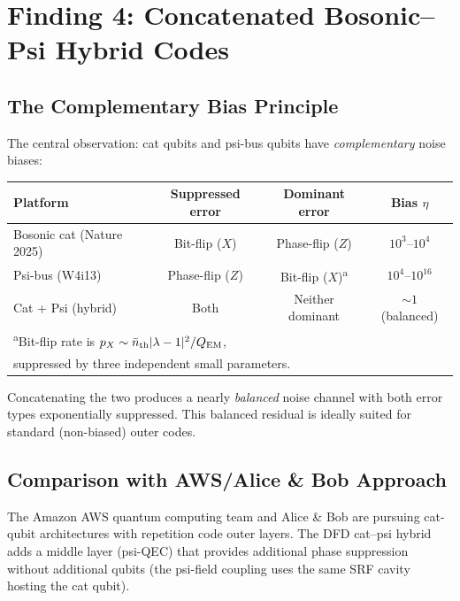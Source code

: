 \documentclass[11pt]{article}
\theoremstyle{definition}
\theoremstyle{remark}
\newcommand{\lamdiff}{|\lambda-1|}
\begin{document}
\section{Finding 4: Concatenated Bosonic--Psi Hybrid Codes}
\label{sec:bosonic-psi}

\subsection{The Complementary Bias Principle}
\label{sec:complementary-bias}

The central observation: cat qubits and psi-bus qubits have
\emph{complementary} noise biases:

\begin{center}
\begin{tabular}{@{}lccc@{}}
\toprule
Platform & Suppressed error & Dominant error & Bias $\eta$ \\
\midrule
Bosonic cat (Nature 2025) & Bit-flip ($X$) & Phase-flip ($Z$) & $10^3$--$10^4$ \\
Psi-bus (W4i13) & Phase-flip ($Z$) & Bit-flip ($X$)\textsuperscript{a} & $10^4$--$10^{16}$ \\
\midrule
Cat + Psi (hybrid) & Both & Neither dominant & $\sim 1$ (balanced) \\
\bottomrule
\multicolumn{4}{l}{\textsuperscript{a}Bit-flip rate is $p_X \sim \bar{n}_{\rm th}\lamdiff^2/Q_{\rm EM}$,}\\
\multicolumn{4}{l}{\phantom{\textsuperscript{a}}suppressed by three independent small parameters.}
\end{tabular}
\end{center}

Concatenating the two produces a nearly \emph{balanced} noise channel with
both error types exponentially suppressed.  This balanced residual is
ideally suited for standard (non-biased) outer codes.

\subsection{Comparison with AWS/Alice \& Bob Approach}
\label{sec:aws-comparison}

The Amazon AWS quantum computing team and Alice \& Bob are pursuing
cat-qubit architectures with repetition code outer layers.  The DFD
cat--psi hybrid adds a middle layer (psi-QEC) that provides additional
phase suppression without additional qubits (the psi-field coupling uses
the same SRF cavity hosting the cat qubit).
\end{document}
